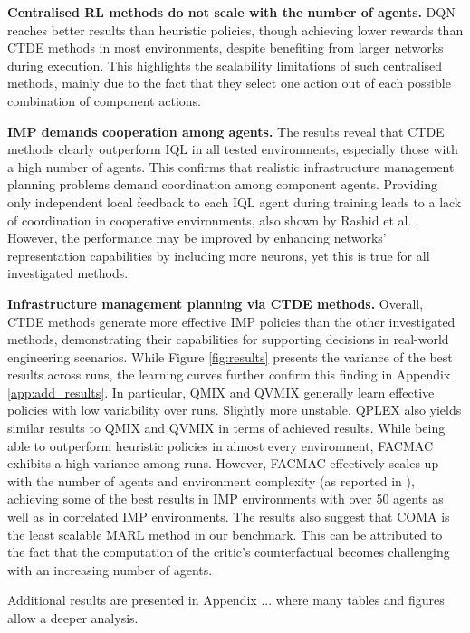 \textbf{Centralised RL methods do not scale with the number of agents.}
DQN reaches better results than heuristic policies, though achieving lower rewards than CTDE methods in most environments, despite benefiting from larger networks during execution.
This highlights the scalability limitations of such centralised methods, mainly due to the fact that they select one action out of each possible combination of component actions.

\textbf{IMP demands cooperation among agents.}
The results reveal that CTDE methods clearly outperform IQL in all tested environments, especially those with a high number of agents.
This confirms that realistic infrastructure management planning problems demand coordination among component agents.
Providing only independent local feedback to each IQL agent during training leads to a lack of coordination in cooperative environments, also shown by Rashid et al. \cite{Rashid2018}. 
However, the performance may be improved by enhancing networks' representation capabilities by including more neurons, yet this is true for all investigated methods.

\textbf{Infrastructure management planning via CTDE methods.}
Overall, CTDE methods generate more effective IMP policies than the other investigated methods, demonstrating their capabilities for supporting decisions in real-world engineering scenarios.
While Figure \ref{fig:results} presents the variance of the best results across runs, the learning curves further confirm this finding in Appendix \ref{app:add_results}.
In particular, QMIX and QVMIX generally learn effective policies with low variability over runs. 
Slightly more unstable, QPLEX also yields similar results to QMIX and QVMIX in terms of achieved results.
While being able to outperform heuristic policies in almost every environment, FACMAC exhibits a high variance among runs.
However, FACMAC effectively scales up with the number of agents and environment complexity (as reported in \citep{peng2021facmac}), achieving some of the best results in IMP environments with over 50 agents as well as in correlated IMP environments.
The results also suggest that COMA is the least scalable MARL method in our benchmark.
This can be attributed to the fact that the computation of the critic's counterfactual becomes challenging with an increasing number of agents.

Additional results are presented in Appendix ... where many tables and figures allow a deeper analysis.  

